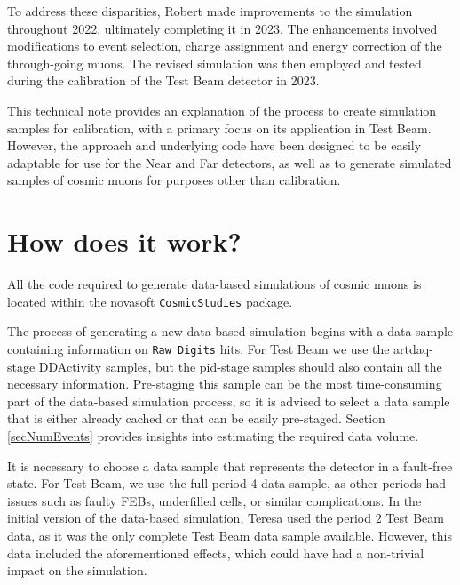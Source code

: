 \documentclass[12pt]{article}
\begin{document}
To address these disparities, Robert made improvements to the simulation throughout 2022, ultimately completing it in 2023. The enhancements involved modifications to event selection, charge assignment and energy correction of the through-going muons. The revised simulation was then employed and tested during the calibration of the Test Beam detector in 2023.

This technical note provides an explanation of the process to create simulation samples for calibration, with a primary focus on its application in Test Beam. However, the approach and underlying code have been designed to be easily adaptable for use for the Near and Far detectors, as well as to generate simulated samples of cosmic muons for purposes other than calibration.

\newpage
\section{How does it work?}

All the code required to generate data-based simulations of cosmic muons is located within the novasoft \texttt{CosmicStudies} package.

The process of generating a new data-based simulation begins with a data sample containing information on \texttt{Raw Digits} hits. For Test Beam we use the artdaq-stage DDActivity samples, but the pid-stage samples should also contain all the necessary information. Pre-staging this sample can be the most time-consuming part of the data-based simulation process, so it is advised to select a data sample that is either already cached or that can be easily pre-staged. Section \ref{secNumEvents} provides insights into estimating the required data volume.

It is necessary to choose a data sample that represents the detector in a fault-free state. For Test Beam, we use the full period 4 data sample, as other periods had issues such as faulty FEBs, underfilled cells, or similar complications. In the initial version of the data-based simulation, Teresa used the period 2 Test Beam data, as it was the only complete Test Beam data sample available. However, this data included the aforementioned effects, which could have had a non-trivial impact on the simulation.

\end{document}
